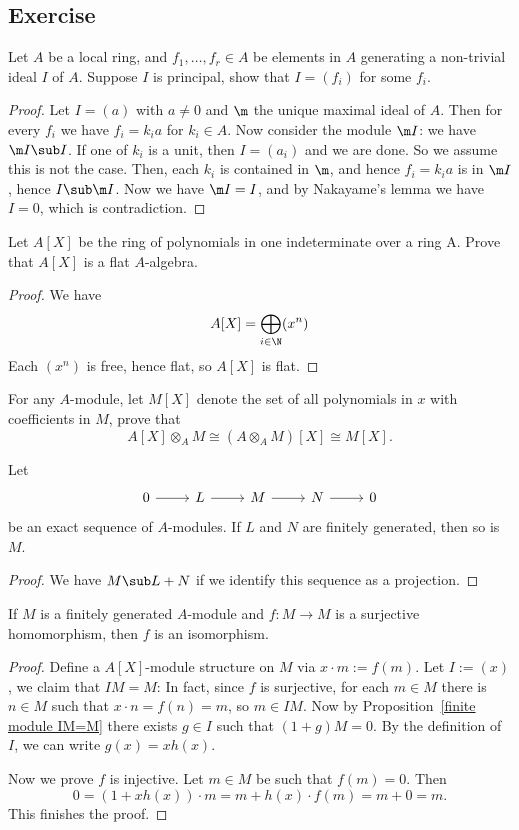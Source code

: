 \subsection{Exercise}
\begin{exercise}
Let $A$ be a local ring, and $f_1,\dots,f_r\in A$ be elements in $A$ generating a non-trivial ideal $I$ of $A$. Suppose $I$ is principal, show that $I=(f_i)$ for some $f_i$.
\end{exercise}
\begin{proof}
Let $I=(a)$ with $a\neq 0$ and $\m$ the unique maximal ideal of $A$. Then for every $f_i$ we have $f_i=k_ia$ for $k_i\in A$. Now consider the module $\m I$: we have $\m I\sub I$. If one of $k_i$ is a unit, then $I=(a_i)$ and we are done. So we assume this is not the case. Then, each $k_i$ is contained in $\m$, and hence $f_i=k_ia$ is in $\m I$, hence $I\sub\m I$. Now we have $\m I=I$, and by Nakayame's lemma we have $I=0$, which is contradiction.
\end{proof}
\begin{exercise}
Let $A[X]$ be the ring of polynomials in one indeterminate over a ring A. Prove that $A[X]$ is a flat $A$-algebra.
\end{exercise}
\begin{proof}
We have
\[A[X]=\bigoplus_{i\in\N}(x^n)\]
Each $(x^n)$ is free, hence flat, so $A[X]$ is flat.
\end{proof}
\begin{exercise}
For any $A$-module, let $M[X]$ denote the set of all polynomials in $x$ with coefficients in $M$, prove that
\[A[X]\otimes_AM\cong (A\otimes_AM)[X]\cong M[X].\]
\end{exercise}
\begin{exercise}
Let 
\[\begin{tikzcd}
0\ar[r]&L\ar[r]&M\ar[r]&N\ar[r]&0
\end{tikzcd}\]
be an exact sequence of $A$-modules. If $L$ and $N$ are finitely generated, then so is $M$.
\end{exercise}
\begin{proof}
We have $M\sub L+N$ if we identify this sequence as a projection.
\end{proof}
\begin{exercise}
If $M$ is a finitely generated $A$-module and $f:M\to M$ is a surjective homomorphism, then $f$ is an isomorphism.
\end{exercise}
\begin{proof}
Define a $A[X]$-module structure on $M$ via $x\cdot m:=f(m)$. Let $I:=(x)$, we claim that $IM=M$: In fact, since $f$ is surjective, for each $m\in M$ there is $n\in M$ such that $x\cdot n=f(n)=m$, so $m\in IM$. Now by Proposition~\ref{finite module IM=M} there exists $g\in I$ such that $(1+g)M=0$. By the definition of $I$, we can write $g(x)=xh(x)$.\par
Now we prove $f$ is injective. Let $m\in M$ be such that $f(m)=0$. Then
\[0=(1+xh(x))\cdot m=m+h(x)\cdot f(m)=m+0=m.\]
This finishes the proof.
\end{proof}
